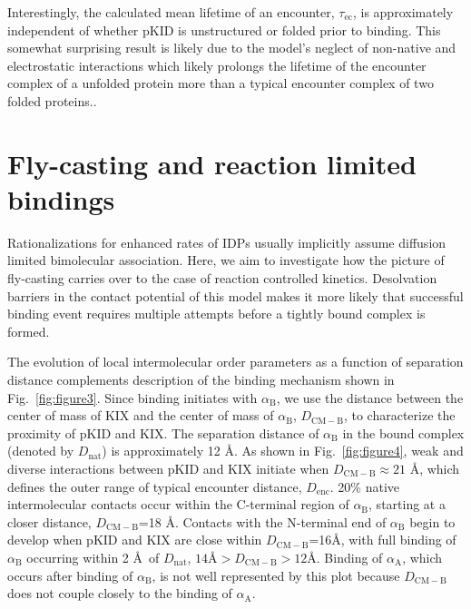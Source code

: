 \documentclass[../talant.diss.submit.tex]{subfiles}
\begin{document}
Interestingly, the calculated mean lifetime of an encounter,
$\tau_{\mathrm{ec}}$, is approximately independent of whether pKID is
unstructured or folded prior to binding. This somewhat surprising result is
likely due to the model's neglect of non-native and electrostatic interactions
which likely prolongs the lifetime of the encounter complex of a unfolded
protein more than a typical encounter complex of two folded
proteins.\cite{huang:10a,kim:18d}.

%
\section{\textbf{Fly-casting and reaction limited bindings}}\label{sect:three_four}
%
Rationalizations for enhanced rates of IDPs usually implicitly assume diffusion
limited bimolecular association. Here, we aim to investigate how the picture of
fly-casting carries over to the case of reaction controlled
kinetics. Desolvation barriers in the contact potential of this model makes it
more likely that successful binding event requires multiple attempts before a
tightly bound complex is formed.

The evolution of local intermolecular order parameters as a function of
separation distance complements description of the binding mechanism shown in
Fig.~\ref{fig:figure3}. Since binding initiates with $\alpha_\mathrm{B}$, we use
the distance between the center of mass of KIX and the center of mass of
$\alpha_\mathrm{B}$, $D_{\mathrm{CM-B}}$, to characterize the proximity of pKID
and KIX.  The separation distance of $\alpha_\mathrm{B}$ in the bound complex
(denoted by $D_\mathrm{nat}$) is approximately 12 \AA.  As shown in
Fig.~\ref{fig:figure4}, weak and diverse interactions between pKID and KIX
initiate when $D_\mathrm{CM-B} \approx 21$ \AA, which defines the outer range of
typical encounter distance, $D_\mathrm{enc}$. 20\% native intermolecular
contacts occur within the C-terminal region of $\alpha_{\mathrm{B}}$, starting
at a closer distance, $D_{\mathrm{CM-B}}$=18 \AA.  Contacts with the N-terminal
end of $\alpha_\mathrm{B}$ begin to develop when pKID and KIX are close within
$D_{\mathrm{CM-B}}$=16\AA, with full binding of $\alpha_\mathrm{B}$ occurring
within 2 \AA~of $D_\mathrm{nat}$,
$14 \mbox{\AA} > D_{\mathrm{CM-B}}> 12\mbox{\AA}$.  Binding of
$\alpha_\mathrm{A}$, which occurs after binding of $\alpha_\mathrm{B}$, is not
well represented by this plot because $D_\mathrm{CM-B}$ does not couple closely
to the binding of $\alpha_{\mathrm{A}}$.
\end{document}
